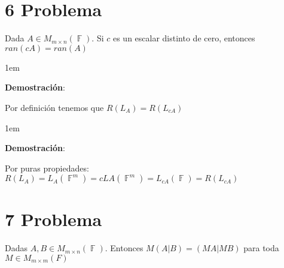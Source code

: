 \documentclass[12pt, fleqn]{article}                             %
\newenvironment{SmallIndentation}[1][0.75em]                    %
        {\begin{adjustwidth}{#1}{}\begin{footnotesize}}             %
        {\end{footnotesize}\end{adjustwidth}}                       %
\theoremstyle{break}                                            %
\DeclareMathOperator \GenericField {\mathbb{F}}                 %
\begin{document}
\section{6 Problema}

    Dada $A \in M_{m \times n}(\GenericField)$. Si $c$ es un escalar distinto de cero,
    entonces $ran(cA) = ran(A)$

    \begin{SmallIndentation}[1em]
        \textbf{Demostración}:
        
        Por definición tenemos que $R(L_A) = R(L_{cA})$
    
        \begin{SmallIndentation}[1em]
            \textbf{Demostración}:
            
            Por puras propiedades:
            $R(L_A) = L_A(\GenericField^m) = cLA(\GenericField^m) = L_{cA}(\GenericField) = R(L_{cA})$
        
        \end{SmallIndentation}
            
    \end{SmallIndentation}
        


\section{7 Problema}

    Dadas $A, B \in M_{m \times n}(\GenericField)$. Entonces $M(A|B) = (MA|MB)$ para toda
    $M \in M_{m \times m}(F)$
\end{document}
